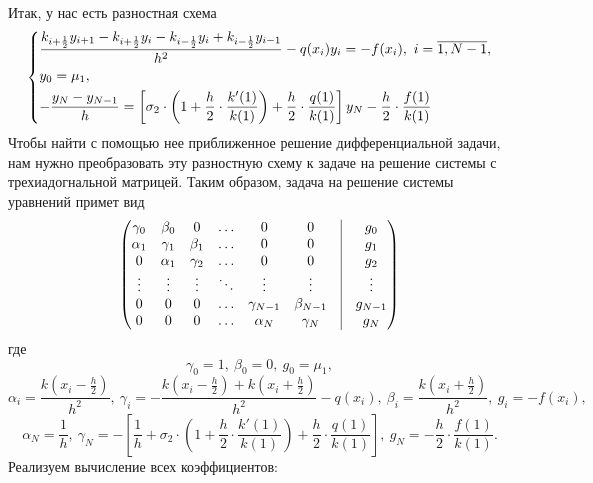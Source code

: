 \documentclass[a4paper, 12pt]{article}
\begin{document}
    Итак, у нас есть разностная схема \[\begin{dcases}
            \dfrac{k_{i+\frac12}y_{i+1} - k_{i+\frac12} y_i -k_{i-\frac12} y_i + k_{i-\frac12} y_{i-1} }{h^2} - q(x_i) y_i = -f(x_i),\ i = \overline{1, N-1},\\
            y_0 = \mu_1,\\
            - \dfrac{y_N - y_{N-1}}{h} = \left[\sigma_2\cdot \left(1 + \dfrac h2 \cdot\dfrac { k'(1)}{ k(1)}\right) + \dfrac h 2 \cdot \dfrac {q(1)}{k(1)} \right] y_N - \dfrac h 2 \cdot \dfrac {f(1)}{k(1)}
        \end{dcases}\] Чтобы найти с помощью нее приближенное решение
дифференциальной задачи, нам нужно преобразовать эту разностную схему к
задаче на решение системы с трехиадогнальной матрицей. Таким образом,
задача на решение системы уравнений примет вид \[
        \begin{pmatrix} 
            \gamma_0 & \beta_0 & 0 & \ldots & 0 & 0 & \vrule & g_0 \\ 
            \alpha_1 & \gamma_1 & \beta_1 & \ldots & 0 & 0 & \vrule & g_1\\ 
            0 & \alpha_1 & \gamma_2 & \ldots & 0 & 0 & \vrule & g_2\\ 
            \vdots & \vdots & \vdots & \ddots & \vdots & \vdots & \vrule & \vdots\\ 
            0 & 0 & 0 & \ldots& \gamma_{N-1} & \beta_{N-1} & \vrule & g_{N-1} \\ 
            0 & 0 & 0 & \ldots& \alpha_N& \gamma_N & \vrule & g_N\\\end{pmatrix}
\] где \[\gamma_0 = 1,\ \beta_0 = 0,\ g_0 = \mu_1,\]
\[\alpha_i = \dfrac{k(x_i - \frac h2)}{h^2},\ \gamma_i = -\dfrac{k(x_i - \frac h2) + k(x_i + \frac h2)}{h^2} - q(x_i), \ \beta_i =\dfrac{k(x_i + \frac h2)}{h^2},\ g_i = -f(x_i),\]
\[\alpha_N = \dfrac 1 h,\ \gamma_N = -\left[\dfrac 1h + \sigma_2\cdot \left(1 + \dfrac h2 \cdot\dfrac { k'(1)}{ k(1)}\right) + \dfrac h 2 \cdot \dfrac {q(1)}{k(1)}\right],\ g_N = - \dfrac h 2 \cdot \dfrac {f(1)}{k(1)}.\]
Реализуем вычисление всех коэффициентов:
\end{document}
